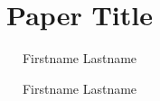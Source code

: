 
\usepackage{lccaps}


%

\ifpdftex
  
\fi


\title{Paper Title}

\author{Firstname Lastname \and Firstname Lastname}



%
%

